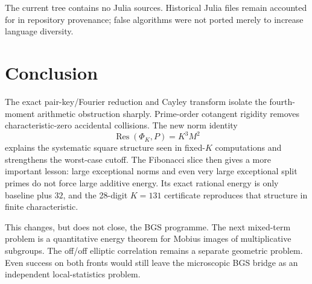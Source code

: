 \documentclass[11pt]{article}
\newcommand{\Res}{\operatorname{Res}}
\begin{document}
The current tree contains no Julia sources.  Historical Julia files remain
accounted for in repository provenance; false algorithms were not ported merely
to increase language diversity.

\section{Conclusion}

The exact pair-key/Fourier reduction and Cayley transform isolate the
fourth-moment arithmetic obstruction sharply.  Prime-order cotangent rigidity
removes characteristic-zero accidental collisions.  The new norm identity
\[
\Res(\Phi_K,P)=K^3M^2
\]
explains the systematic square structure seen in fixed-$K$ computations and
strengthens the worst-case cutoff.  The Fibonacci slice then gives a more
important lesson: large exceptional norms and even very large exceptional
split primes do not force large additive energy.  Its exact rational energy is
only baseline plus $32$, and the 28-digit $K=131$ certificate reproduces that
structure in finite characteristic.

This changes, but does not close, the BGS programme.  The next mixed-term
problem is a quantitative energy theorem for Mobius images of multiplicative
subgroups.  The off/off elliptic correlation remains a separate geometric
problem.  Even success on both fronts would still leave the microscopic BGS
bridge as an independent local-statistics problem.
\end{document}

